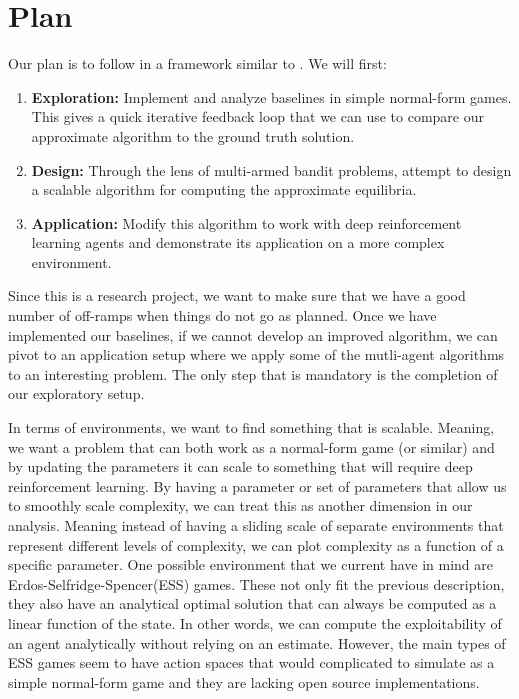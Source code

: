 \documentclass{article}
\begin{document}
\section{Plan}
Our plan is to follow in a framework similar to \cite{dip}. We will first:
\begin{enumerate}
	\item \textbf{Exploration:} Implement and analyze baselines in simple
        normal-form games. This gives a quick iterative feedback loop that we
        can use to compare our approximate algorithm to the ground truth
        solution.
	\item \textbf{Design:} Through the lens of multi-armed bandit problems,
        attempt to design a scalable algorithm for computing the approximate
        equilibria.
    \item \textbf{Application:} Modify this algorithm to work with deep reinforcement learning agents
        and demonstrate its application on a more complex environment.
\end{enumerate}
Since this is a research project, we want to make sure that we have a good
number of off-ramps when things do not go as planned. Once we have implemented
our baselines, if we cannot develop an improved algorithm, we can pivot to an
application setup where we apply some of the mutli-agent algorithms to an
interesting problem. The only step that is mandatory is the completion of our
exploratory setup. 

In terms of environments, we want to find something that is scalable. Meaning,
we want a problem that can both work as a normal-form game (or similar) and by
updating the parameters it can scale to something that will require deep
reinforcement learning. By having a parameter or set of parameters that allow us
to smoothly scale complexity, we can treat this as another dimension in our
analysis. Meaning instead of having a sliding scale of separate environments
that represent different levels of complexity, we can plot complexity as a
function of a specific parameter. One possible environment that we current have
in mind are Erdos-Selfridge-Spencer(ESS)\cite{ESS} games. These not only fit the
previous description, they also have an analytical optimal solution that can
always be computed as a linear function of the state. In other words, we can
compute the exploitability of an agent analytically without relying on an
estimate. However, the main types of ESS games seem to have action spaces that
would complicated to simulate as a simple normal-form game and they are lacking
open source implementations.
\end{document}
